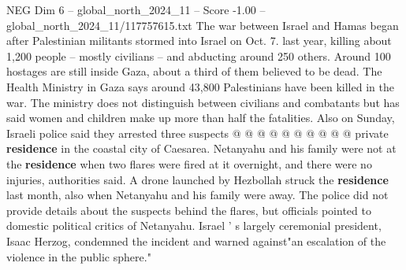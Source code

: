 \begin{textsample}{NEG Dim 6 – global\_north\_2024\_11 – Score -1.00 – global\_north\_2024\_11/117757615.txt}
The war between Israel and Hamas began after Palestinian militants stormed into Israel on Oct. 7. last year, killing about 1,200 people -- mostly civilians -- and abducting around 250 others.
Around 100 hostages are still inside Gaza, about a third of them believed to be dead.
The Health Ministry in Gaza says around 43,800 Palestinians have been killed in the war.
The ministry does not distinguish between civilians and combatants but has said women and children make up more than half the fatalities.
Also on Sunday, Israeli police said they arrested three suspects @ @ @ @ @ @ @ @ @ @ private \textbf{residence} in the coastal city of Caesarea.
Netanyahu and his family were not at the \textbf{residence} when two flares were fired at it overnight, and there were no injuries, authorities said.
A drone launched by Hezbollah struck the \textbf{residence} last month, also when Netanyahu and his family were away.
The police did not provide details about the suspects behind the flares, but officials pointed to domestic political critics of Netanyahu.
Israel ' s largely ceremonial president, Isaac Herzog, condemned the incident and warned against"an escalation of the violence in the public sphere."

\end{textsample}
